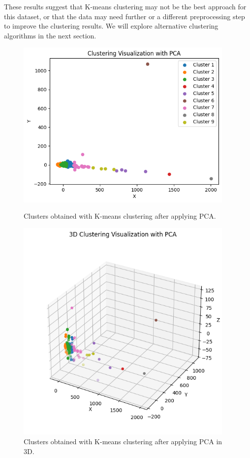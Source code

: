 These results suggest that K-means clustering may not be the best approach for this dataset, or that the data may need further or a
different preprocessing step to improve the clustering results. We will explore alternative clustering algorithms in the next section.

\begin{figure}[H]
	\centering
	\begin{minipage}[t]{0.48\textwidth}
		\centering
		\includegraphics[width=0.95\textwidth]{../imgs/graphs/clustering/cluster_pca.png}
		\caption{Clusters obtained with K-means clustering after applying PCA.}
		\label{fig:clusters_k9_pca}
	\end{minipage}\hfill
	\begin{minipage}[t]{0.48\textwidth}
		\centering
		\includegraphics[width=0.95\textwidth]{../imgs/graphs/clustering/cluster_pca_3d.png}
		\caption{Clusters obtained with K-means clustering after applying PCA in 3D.}
		\label{fig:clusters_k9_pca_3d}
	\end{minipage}
\end{figure}

